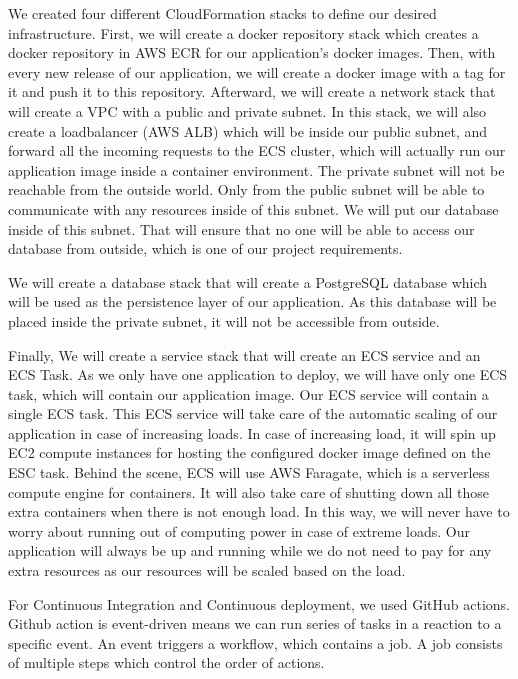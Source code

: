 We created four different CloudFormation stacks to define our desired infrastructure. First, we will create a docker repository stack which creates a docker repository in AWS ECR for our application's docker images. Then, with every new release of our application, we will create a docker image with a tag for it and push it to this repository. Afterward, we will create a network stack that will create a VPC with a public and private subnet. In this stack, we will also create a loadbalancer (AWS ALB) which will be inside our public subnet, and forward all the incoming requests to the ECS cluster, which will actually run our application image inside a container environment. The private subnet will not be reachable from the outside world. Only from the public subnet will be able to communicate with any resources inside of this subnet. We will put our database inside of this subnet. That will ensure that no one will be able to access our database from outside, which is one of our project requirements.

We will create a database stack that will create a PostgreSQL database which will be used as the persistence layer of our application. As this database will be placed inside the private subnet, it will not be accessible from outside.

Finally, We will create a service stack that will create an ECS service and an ECS Task. As we only have one application to deploy, we will have only one ECS task, which will contain our application image. Our ECS service will contain a single ECS task. This ECS service will take care of the automatic scaling of our application in case of increasing loads. In case of increasing load, it will spin up EC2 compute instances for hosting the configured docker image defined on the ESC task. Behind the scene, ECS will use AWS Faragate, which is a serverless compute engine for containers. It will also take care of shutting down all those extra containers when there is not enough load. In this way, we will never have to worry about running out of computing power in case of extreme loads. Our application will always be up and running while we do not need to pay for any extra resources as our resources will be scaled based on the load.

For Continuous Integration and Continuous deployment, we used GitHub actions. Github action is event-driven means we can run series of tasks in a reaction to a specific event. An event triggers a workflow, which contains a job. A job consists of multiple steps which control the order of actions.

